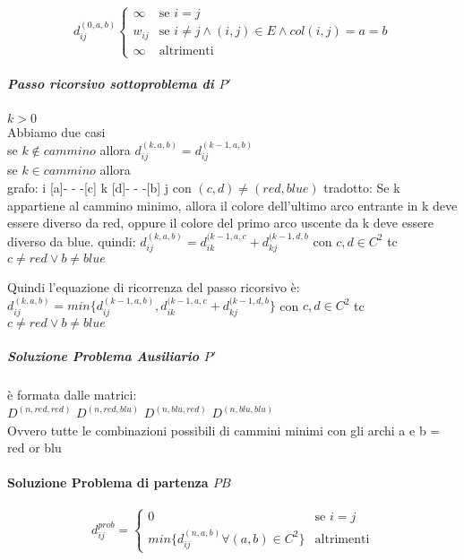 \documentclass[12pt, a4paper, openany]{book}
\begin{document}
	\begin{equation*}
		d^{(0,a,b)}_{ij} \begin{cases}
			\infty & \text{se $i=j$}                                             \\
			w_{ij} & \text{se $i\neq j \land (i,j)\in E \land col(i,j) = a = b$} \\
			\infty & \text{altrimenti}
		\end{cases}
	\end{equation*}

	\subparagraph{Passo ricorsivo sottoproblema di $P'$} $k > 0$\\
	Abbiamo due casi\\
	se $k \notin cammino$ allora $d^{(k,a,b)}_{ij} = d^{(k-1,a,b)}_{ij}$\\
	se $k \in cammino$ allora \\

	grafo: i [a]- - -[c] k [d]- - -[b] j con $(c,d) \neq (red,blue)$
	tradotto: Se k appartiene al cammino minimo, allora il colore dell'ultimo arco entrante in k deve essere diverso da red, oppure il colore del primo arco uscente da k deve essere diverso da blue.
	quindi: $d^{(k,a,b)}_{ij} = d^{(k-1,a,c}_{ik} + d^{(k-1,d,b}_{kj}$ con $c,d \in C^2$ tc $c\neq red \vee b\neq blue$

	Quindi l'equazione di ricorrenza del passo ricorsivo è:\\
$d^{(k,a,b)}_{ij} = min\{d^{(k-1,a,b)}_{ij} ,d^{(k-1,a,c}_{ik} + d^{(k-1,d,b}_{kj}\}$ con $c,d \in C^2$ tc $c\neq red \vee b\neq blue$

	\subparagraph{Soluzione Problema Ausiliario $P'$} è formata dalle matrici:\\
$D^{(n,red,red)}$ $D^{(n,red,blu)}$ $D^{(n,blu,red)}$ $D^{(n,blu,blu)}$ \\
	Ovvero tutte le combinazioni possibili di cammini minimi con gli archi a e b = red or blu

	\paragraph{Soluzione Problema di partenza $PB$}
	\begin{equation*}
		d^{prob}_{ij} = \begin{cases}
			0                                             & \text{se $i=j$}   \\
			min\{d^{(n,a,b)}_{ij} \forall (a,b) \in C^2\} & \text{altrimenti}
		\end{cases}
	\end{equation*}
\end{document}
